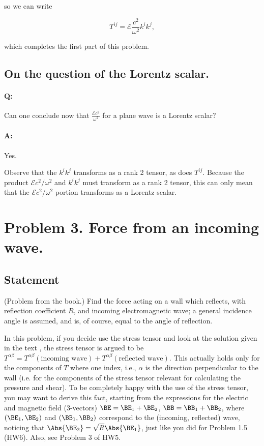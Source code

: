 so we can write

\begin{equation}\label{eqn:relElectroDynProblemSet6:190}
T^{i j} 
= \mathcal{E} \frac{c^2}{\omega^2} k^i k^j,
\end{equation}

which completes the first part of this problem.

\subsection{On the question of the Lorentz scalar.}

\paragraph{Q:} Can one conclude now that $\frac{\mathcal{E} c^2}{\omega^2}$ for a plane wave is a Lorentz scalar?
\paragraph{A:} Yes.

Observe that the $k^i k^j$ transforms as a rank 2 tensor, as does $T^{i j}$.  Because the product $\mathcal{E} c^2/\omega^2$ and $k^i k^j$ must transform as a rank 2 tensor, this can only mean that the $\mathcal{E} c^2/\omega^2$ portion transforms as a Lorentz scalar.

\section{Problem 3.  Force from an incoming wave.}
\subsection{Statement}

(Problem from the book.)  Find the force acting on a wall which reflects, with reflection coefficient $R$, and incoming electromagnetic wave; a general incidence angle is assumed, and is, of course, equal to the angle of reflection.

In this problem, if you decide use the stress tensor and look at the solution given in the text \cite{landau1980classical}, the stress tensor is argued to be  $T^{\alpha \beta} = T^{\alpha \beta}(\text{incoming wave}) + T^{\alpha \beta}(\text{reflected wave})$.  This actually holds only for the components of $T$ where one index, i.e., $\alpha$ is the direction perpendicular to the wall (i.e. for the components of the stress tensor relevant for calculating the pressure and shear). To be completely happy with the use of the stress tensor, you may want to derive this fact, starting from the expressions for the electric and magnetic field (3-vectors) $\BE = \BE_1 + \BE_2$, $\BB = \BB_1 + \BB_2$, where $(\BE_1, \BE_2)$ and $(\BB_1, \BB_2)$ correspond to the (incoming, reflected) wave, noticing that $\Abs{\BE_2} = \sqrt{R}\Abs{\BE_1}$, just like you did for Problem 1.5 (HW6).  Also, see Problem 3 of HW5.

